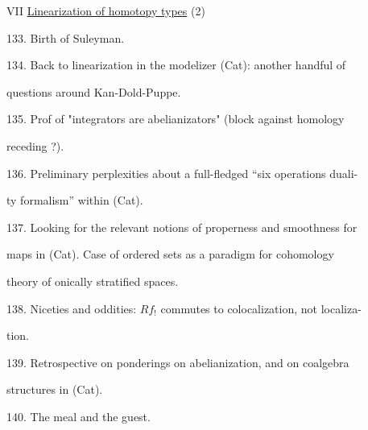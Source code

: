 VII \quad \uline{Linearization of homotopy types}  (2)\par

133. Birth of Suleyman.\par
134. Back to linearization in the modelizer (Cat): another handful of\par
questions around Kan-Dold-Puppe.\par

135. Prof of "integrators are abelianizators" (block against homology\par
receding ?).\par

136. Preliminary perplexities about a full-fledged ``six operations duali-\par%
ty formalism'' within (Cat).\par

137. Looking for the relevant notions of properness and smoothness for\par
maps in (Cat). Case of ordered sets as a paradigm for cohomology\par
theory of onically stratified spaces.\par

138. Niceties and oddities: $Rf_!$ commutes to colocalization, not localiza-\par%
tion.\par

139. Retrospective on ponderings on abelianization, and on coalgebra\par
structures in (Cat).\par

140. The meal and the guest.\par

\par

